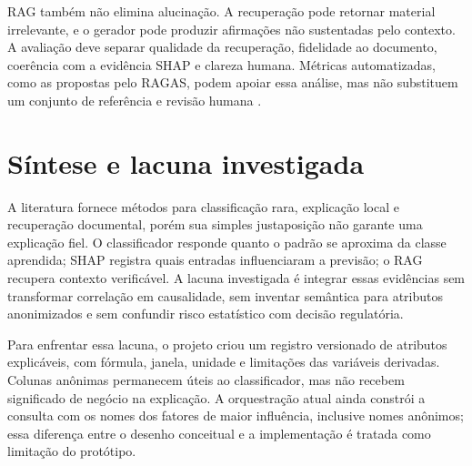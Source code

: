 RAG também não elimina alucinação. A recuperação pode retornar material irrelevante, e o gerador pode produzir afirmações não sustentadas pelo contexto. A avaliação deve separar qualidade da recuperação, fidelidade ao documento, coerência com a evidência SHAP e clareza humana. Métricas automatizadas, como as propostas pelo RAGAS, podem apoiar essa análise, mas não substituem um conjunto de referência e revisão humana \cite{es2024ragas}.

\section{Síntese e lacuna investigada}

A literatura fornece métodos para classificação rara, explicação local e recuperação documental, porém sua simples justaposição não garante uma explicação fiel. O classificador responde quanto o padrão se aproxima da classe aprendida; SHAP registra quais entradas influenciaram a previsão; o RAG recupera contexto verificável. A lacuna investigada é integrar essas evidências sem transformar correlação em causalidade, sem inventar semântica para atributos anonimizados e sem confundir risco estatístico com decisão regulatória.

Para enfrentar essa lacuna, o projeto criou um registro versionado de atributos explicáveis, com fórmula, janela, unidade e limitações das variáveis derivadas. Colunas anônimas permanecem úteis ao classificador, mas não recebem significado de negócio na explicação. A orquestração atual ainda constrói a consulta com os nomes dos fatores de maior influência, inclusive nomes anônimos; essa diferença entre o desenho conceitual e a implementação é tratada como limitação do protótipo.
